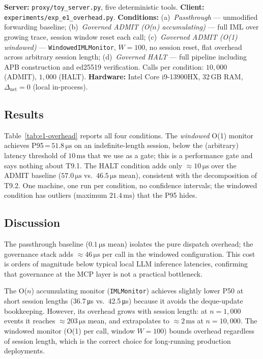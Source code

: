 \documentclass[11pt]{article}
\newcommand{\Dnet}{\Delta_{\mathrm{net}}}
\begin{document}
\textbf{Server:} \texttt{proxy/toy\_server.py}, five deterministic tools.
\textbf{Client:} \texttt{experiments/exp\_e1\_overhead.py}.
\textbf{Conditions:}
(a)~\emph{Passthrough} --- unmodified forwarding baseline;
(b)~\emph{Governed ADMIT (O($n$) accumulating)} --- full IML over growing trace, session window reset each call;
(c)~\emph{Governed ADMIT (O(1) windowed)} --- \texttt{WindowedIMLMonitor}, $W{=}100$, no session reset, flat overhead across arbitrary session length;
(d)~\emph{Governed HALT} --- full pipeline including APB construction and ed25519 verification.
Calls per condition: $10{,}000$ (ADMIT), $1{,}000$ (HALT).
\textbf{Hardware:} Intel Core i9-13900HX, 32\,GB RAM, $\Dnet = 0$ (local in-process).

\subsection{Results}



\noindent
Table~\ref{tab:e1-overhead} reports all four conditions.
The \emph{windowed} O(1) monitor achieves P95\,=\,$51.8\,\si{\micro\second}$
on an indefinite-length session, below the (arbitrary) latency threshold of
$10\,\si{\milli\second}$ that we use as a gate; this is a performance gate and
says nothing about T9.1. The HALT condition adds only
$\approx 10\,\si{\micro\second}$ over the ADMIT baseline
($57.0\,\si{\micro\second}$ vs.\ $46.5\,\si{\micro\second}$ mean), consistent
with the decomposition of T9.2. One machine, one run per condition, no
confidence intervals; the windowed condition has outliers (maximum
$21.4\,\si{\milli\second}$) that the P95 hides.

\subsection{Discussion}

The passthrough baseline ($0.1\,\si{\micro\second}$ mean) isolates the pure
dispatch overhead; the governance stack adds $\approx 46\,\si{\micro\second}$
per call in the windowed configuration.
This cost is orders of magnitude below typical local LLM inference
latencies, confirming that governance at the MCP layer is not a
practical bottleneck.

The O($n$) accumulating monitor (\texttt{IMLMonitor}) achieves slightly
lower P50 at short session lengths (36.7\,\si{\micro\second} vs.\
42.5\,\si{\micro\second}) because it avoids the deque-update bookkeeping.
However, its overhead grows with session length: at $n=1{,}000$ events it
reaches $\approx 203\,\si{\micro\second}$ mean, and extrapolates to
$\approx 2\,\si{\milli\second}$ at $n=10{,}000$.
The windowed monitor (O(1) per call, window $W=100$) bounds overhead
regardless of session length, which is the correct choice for
long-running production deployments.
\end{document}
